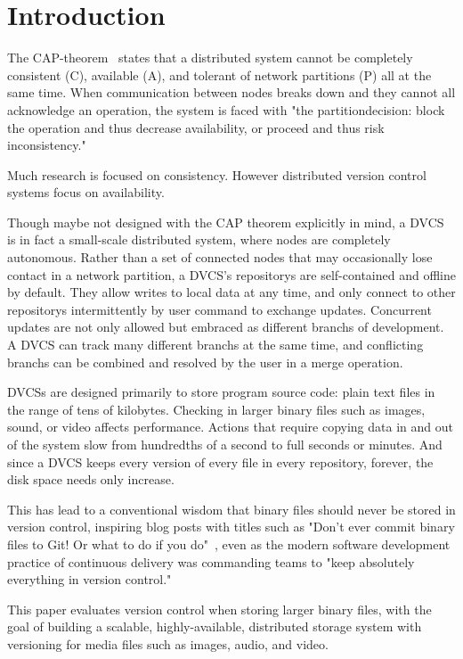 \section{Introduction}

The \gls{CAP-theorem}~\cite{cap_origin} states that a distributed system cannot be completely consistent (C), available (A), and tolerant of network partitions (P) all at the same time.
When communication between nodes breaks down and they cannot all acknowledge an operation, the system is faced with "the \gls{partitiondecision}: block the operation and thus decrease availability, or proceed and thus risk inconsistency."~\cite{cap_years_later}

Much research is focused on consistency.
However distributed version control systems focus on availability.

Though maybe not designed with the CAP theorem explicitly in mind, a \gls{DVCS} is in fact a small-scale distributed system, where nodes are completely autonomous.
Rather than a set of connected nodes that may occasionally lose contact in a network partition, a \gls{DVCS}'s \glspl{repository} are self-contained and offline by default.
They allow writes to local data at any time, and only connect to other \glspl{repository} intermittently by user command to exchange updates.
Concurrent updates are not only allowed but embraced as different \glspl{branch} of development.
A \gls{DVCS} can track many different \glspl{branch} at the same time, and conflicting \glspl{branch} can be combined and resolved by the user in a \gls{merge} operation.

\Glspl{DVCS} are designed primarily to store program source code: plain text files in the range of tens of kilobytes.
Checking in larger binary files such as images, sound, or video affects performance.
Actions that require copying data in and out of the system slow from hundredths of a second to full seconds or minutes.
And since a \gls{DVCS} keeps every version of every file in every \gls{repository}, forever, the disk space needs only increase.

This has lead to a conventional wisdom that binary files should never be stored in version control, inspiring blog posts with titles such as
"Don't ever commit binary files to Git! Or what to do if you do"~\cite{dont_ever_commit_binaries_to_version_control},
even as the modern software development practice of continuous delivery was commanding teams to "keep absolutely everything in version control."~\cite[p.33]{continuousdeliverybook}

This paper evaluates version control when storing larger binary files, with the goal of building a scalable, highly-available, distributed storage system with versioning for media files such as images, audio, and video.

